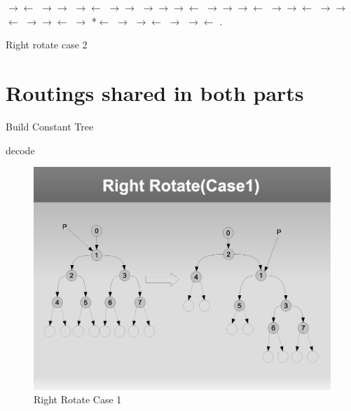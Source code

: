 \documentclass[a4paper]{article}
\begin{document}
\begin{algorithm}[H]

\NodeAllocate{\NewNode}\;
\NewNode$\rightarrow$\Left $\leftarrow$ \Node$\rightarrow$\Right$\rightarrow$\Left\;
\NewNode$\rightarrow$\Right $\leftarrow$ \Node$\rightarrow$\Right$\rightarrow$\Right\;
\Node$\rightarrow$\Right$\rightarrow$\Left$\rightarrow$\Parent $\leftarrow$ \NewNode\;
\Node$\rightarrow$\Right$\rightarrow$\Right$\rightarrow$\Parent $\leftarrow$ \NewNode\;
\Node$\rightarrow$\Right$\rightarrow$\Right $\leftarrow$ \NewNode\;
\Node$\rightarrow$\Right$\rightarrow$\Left $\leftarrow$ \Node\;
\Node$\rightarrow$\Right$\rightarrow$\Parent $\leftarrow$ \Node$\rightarrow$\Parent\;
*\ParentPoint $\leftarrow$ \Node$\rightarrow$\Right\;
\Node$\rightarrow$\Parent $\leftarrow$ \Node$\rightarrow$\Right\;
\NodeAllocate{\AnotherNewNode}\;
\Node$\rightarrow$\Right $\leftarrow$ \AnotherNewNode\;
\Pointers.\Update{\Node$\rightarrow$\Parent, \Node$\rightarrow$\Parent$\rightarrow$\Right}\;
\caption{Right rotate case 2}
\end{algorithm}

\section{Routings shared in both parts}

\begin{algorithm}[H]
    \caption{Build Constant Tree}
\end{algorithm}

\begin{algorithm}[H]
    \caption{decode}
\end{algorithm}

\appendix
\begin{figure}
    \centering
    \includegraphics[scale=0.5]{right_rotate_1.eps}
    \caption{Right Rotate Case 1}
\end{figure}
\end{document}
